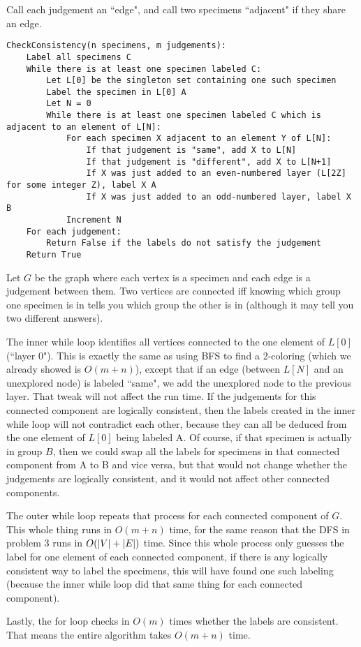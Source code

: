 \documentclass{article}
\begin{document}
\bigskip
\par
\begin{prob}
\end{prob}
Call each judgement an ``edge", and call two specimens ``adjacent" if they share an edge. 
\begin{verbatim}
CheckConsistency(n specimens, m judgements):
    Label all specimens C
    While there is at least one specimen labeled C:
        Let L[0] be the singleton set containing one such specimen
        Label the specimen in L[0] A
        Let N = 0
        While there is at least one specimen labeled C which is adjacent to an element of L[N]:
            For each specimen X adjacent to an element Y of L[N]:
                If that judgement is "same", add X to L[N]
                If that judgement is "different", add X to L[N+1]
                If X was just added to an even-numbered layer (L[2Z] for some integer Z), label X A
                If X was just added to an odd-numbered layer, label X B
            Increment N
    For each judgement:
        Return False if the labels do not satisfy the judgement
    Return True
\end{verbatim}
Let $G$ be the graph where each vertex is a specimen and each edge is a judgement between them. Two vertices are connected iff knowing which group one specimen is in tells you which group the other is in (although it may tell you two different answers).
\par
The inner while loop identifies all vertices connected to the one element of $L[0]$ (``layer 0"). This is exactly the same as using BFS to find a 2-coloring (which we already showed is $O(m+n)$), except that if an edge (between $L[N]$ and an unexplored node) is labeled ``same", we add the unexplored node to the previous layer. That tweak will not affect the run time. If the judgements for this connected component are logically consistent, then the labels created in the inner while loop will not contradict each other, because they can all be deduced from the one element of $L[0]$ being labeled A. Of course, if that specimen is actually in group $B$, then we could swap all the labels for specimens in that connected component from A to B and vice versa, but that would not change whether the judgements are logically consistent, and it would not affect other connected components.
\par
The outer while loop repeats that process for each connected component of $G$. This whole thing runs in $O(m+n)$ time, for the same reason that the DFS in problem 3 runs in $O(\left\lvert V \right\rvert+\left\lvert E \right\rvert)$ time. Since this whole process only guesses the label for one element of each connected component, if there is any logically consistent way to label the specimens, this will have found one such labeling (because the inner while loop did that same thing for each connected component).
\par
Lastly, the for loop checks in $O(m)$ times whether the labels are consistent. That means the entire algorithm takes $O(m+n)$ time.


\end{document}
